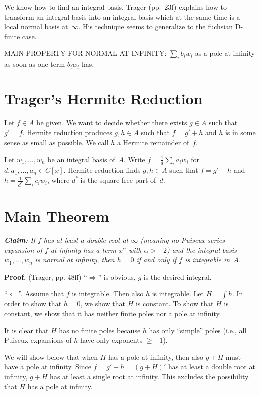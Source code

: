 \documentclass[a4paper,draft]{article}
\begin{document}
We know how to find an integral basis. Trager (pp.~23f) explains how to transform an integral
basis into an integral basis which at the same time is a local normal basis at~$\infty$.
His technique seems to generalize to the fuchsian D-finite case.

MAIN PROPERTY FOR NORMAL AT INFINITY: $\sum_i b_iw_i$ as a pole at infinity as soon as one term $b_iw_i$ has.

\section{Trager's Hermite Reduction}

Let $f\in A$ be given. We want to decide whether there exists $g\in A$ such that $g'=f$.
Hermite reduction produces $g,h\in A$ such that $f=g'+h$ and $h$ is in some sense as small
as possible. We call $h$ a Hermite remainder of~$f$.

Let $w_1,\dots,w_n$ be an integral basis of~$A$. Write $f=\frac1d\sum_i a_iw_i$
for $d,a_1,\dots,a_n\in C[x]$.
Hermite reduction finds $g,h\in A$ such that $f=g'+h$ and $h=\frac1{d^*}\sum_i c_iw_i$,
where $d^*$ is the square free part of~$d$.

\section{Main Theorem}

\textit{%
  \textbf{Claim:}
  If $f$ has at least a double root at $\infty$
  (meaning no Puiseux series expansion of $f$ at infinity has a term $x^\alpha$ with $\alpha>-2$)
  and the integral basis $w_1,\dots,w_n$ is normal at infinity,
  then $h=0$ if and only if $f$ is integrable in~$A$.
}

\textbf{Proof.} (Trager, pp. 48ff)
``$\Rightarrow$'' is obvious, $g$ is the desired integral.

``$\Leftarrow$''. Assume that $f$ is integrable. Then also $h$ is integrable.
Let $H=\int h$.
In order to show that $h=0$, we show that $H$ is constant.
To show that $H$ is constant, we show that it has neither finite poles nor a pole at infinity.

It is clear that $H$ has no finite poles because $h$ has only ``simple'' poles (i.e., all Puiseux
expansions of $h$ have only exponents $\geq-1$).

We will show below that when $H$ has a pole at infinity, then also $g+H$ must have a pole at infinity.
Since $f=g'+h=(g+H)'$ has at least a double root at infinity, $g+H$ has at least
a single root at infinity. This excludes the possibility that $H$ has a pole at infinity.
\end{document}
